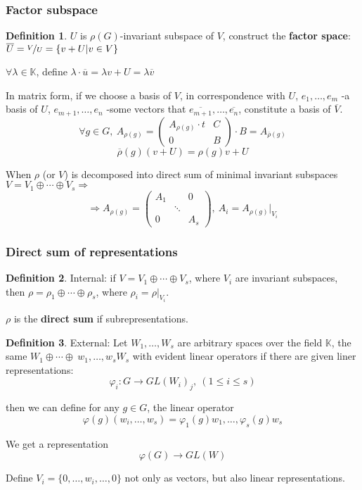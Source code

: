 \documentclass[12pt, a4paper]{article}
\theoremstyle{definition}
\newtheorem{definition}{Definition}[section]
\begin{document}
\subsubsection{Factor subspace}
\begin{definition}
    $U$ is $\rho(G) $-invariant subspace of $V$, construct the \textbf{factor space}: $
    \overline{U} =\nicefrac{V}{U} = \{v+U | v\in V\}$
    \par
    $\forall  \lambda \in \mathbb{K}$, define $\lambda \cdot \overline{u} = \lambda v +U = 
    \lambda \overline{v} $
    \par
    In matrix form, if we choose a basis of $V$, in correspondence with $U$, $e_1, \ldots , 
    e_m $ -a basis of $U$, $e_{m+1},\ldots ,e_n $ -some vectors that $\overline{e_{m+1}}, 
    \ldots, \overline{e_n} $, constitute a basis of $\overline{V}$.
    \[\forall g\in G,\ A_{\rho(g)} =
    \begin{pmatrix}
        A_{\rho(g)}\cdot t  & C \\
        0                   & B
    \end{pmatrix}
    \cdot B = A_{\overline{\rho}(g)} \]
    \[\overline{\rho}(g)(v+U) = \rho(g)v+U \]
    \par
    When $\rho$ (or $V$) is decomposed into direct sum of minimal invariant subspaces $V = V_1
    \oplus \cdots \oplus V_s \Rightarrow $
    \[\Rightarrow A_{\rho(g)} = 
    \begin{pmatrix}
        A_1 &           & 0     \\
            & \ddots    &       \\
        0   &           & A_s
    \end{pmatrix},\ A_i = A_{\rho(g)}|_{V_i}
    \]
\end{definition}
\subsubsection{Direct sum of representations}
\begin{definition}
    Internal: if $V = V_1 \oplus \cdots \oplus V_s $, where $V_i$ are invariant subspaces, 
    then $\rho = \rho_1 \oplus \cdots \oplus \rho_s $, where $\rho_i = \rho|_{V_i} $.
    \par
    $\rho$ is the \textbf{direct sum} if subrepresentations.
\end{definition}
\begin{definition}
    External: Let $W_1, \ldots, W_s $ are arbitrary spaces over the field $\mathbb{K} $, the 
    same $W_1 \oplus \cdots \oplus\ {w_1, \ldots, w_s} W_s $ with evident linear operators if 
    there are given liner representations:
    \[\varphi_i:G \rightarrow {GL(W_i)}_j,\ (1\leqslant i\leqslant s)\]
    \par
    then we can define for any $g\in G $, the linear operator
    \[\varphi(g)(w_i, \ldots, w_s) = \varphi_1(g)w_1, \ldots, \varphi_s(g)w_s \]
    \par
    We get a representation
    \[\varphi(G) \rightarrow GL(W) \]
    \par
    Define $V_i =\{0, \ldots, w_i, \ldots, 0\} $ not only as vectors, but also linear 
    representations.
\end{definition}
\end{document}
